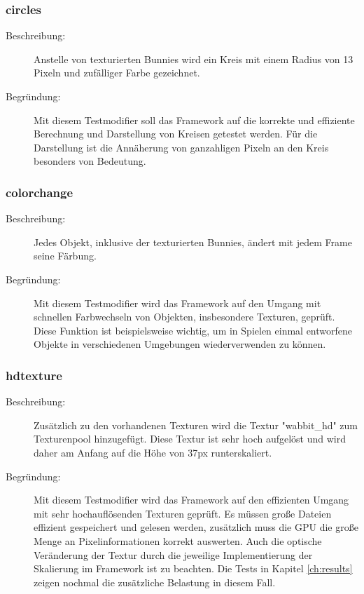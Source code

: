 \subsubsection{circles}
\begin{description}
\item[Beschreibung:] Anstelle von texturierten Bunnies wird ein Kreis mit einem Radius von 13 Pixeln und zufälliger Farbe gezeichnet. \\
\item[Begründung:] Mit diesem Testmodifier soll das Framework auf die korrekte und effiziente Berechnung und Darstellung von Kreisen getestet werden. Für die Darstellung ist die Annäherung von ganzahligen Pixeln an den Kreis besonders von Bedeutung.
\end{description} 

\subsubsection{colorchange}
\begin{description}
\item[Beschreibung:] Jedes Objekt, inklusive der texturierten Bunnies, ändert mit jedem Frame seine Färbung. \\
\item[Begründung:] Mit diesem Testmodifier wird das Framework auf den Umgang mit schnellen Farbwechseln von Objekten, insbesondere Texturen, geprüft. Diese Funktion ist beispielsweise wichtig, um in Spielen einmal entworfene Objekte in verschiedenen Umgebungen wiederverwenden zu können.
\end{description} 

\subsubsection{hdtexture}
\begin{description}
\item[Beschreibung:] Zusätzlich zu den vorhandenen Texturen wird die Textur "wabbit\_hd" zum Texturenpool hinzugefügt. Diese Textur ist sehr hoch aufgelöst und wird daher am Anfang auf die Höhe von 37px runterskaliert. \\
\item[Begründung:] Mit diesem Testmodifier wird das Framework auf den effizienten Umgang mit sehr hochauflösenden Texturen geprüft. Es müssen große Dateien effizient gespeichert und gelesen werden, zusätzlich muss die GPU die große Menge an Pixelinformationen korrekt auswerten. Auch die optische Veränderung der Textur durch die jeweilige Implementierung der Skalierung im Framework ist zu beachten. Die Tests in Kapitel \ref{ch:results} zeigen nochmal die zusätzliche Belastung in diesem Fall.
\end{description} 
 
